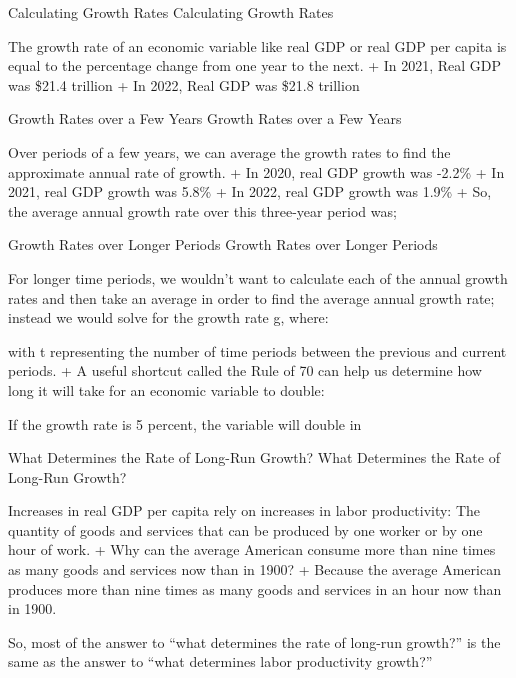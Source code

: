 \documentclass[
  12pt,
  ignorenonframetext,
]{beamer}
\begin{document}
\begin{frame}{Calculating Growth Rates}
\protect\hypertarget{calculating-growth-rates}{}
Calculating Growth Rates

The growth rate of an economic variable like real GDP or real GDP per
capita is equal to the percentage change from one year to the next. + In
2021, Real GDP was \$21.4 trillion + In 2022, Real GDP was \$21.8
trillion
\end{frame}

\begin{frame}{Growth Rates over a Few Years}
\protect\hypertarget{growth-rates-over-a-few-years}{}
Growth Rates over a Few Years

Over periods of a few years, we can average the growth rates to find the
approximate annual rate of growth. + In 2020, real GDP growth was -2.2\%
+ In 2021, real GDP growth was 5.8\% + In 2022, real GDP growth was
1.9\% + So, the average annual growth rate over this three-year period
was;
\end{frame}

\begin{frame}{Growth Rates over Longer Periods}
\protect\hypertarget{growth-rates-over-longer-periods}{}
Growth Rates over Longer Periods

For longer time periods, we wouldn't want to calculate each of the
annual growth rates and then take an average in order to find the
average annual growth rate; instead we would solve for the growth rate
g, where:

with t representing the number of time periods between the previous and
current periods. + A useful shortcut called the Rule of 70 can help us
determine how long it will take for an economic variable to double:

If the growth rate is 5 percent, the variable will double in
\end{frame}

\begin{frame}{What Determines the Rate of Long-Run Growth?}
\protect\hypertarget{what-determines-the-rate-of-long-run-growth}{}
What Determines the Rate of Long-Run Growth?

Increases in real GDP per capita rely on increases in labor
productivity: The quantity of goods and services that can be produced by
one worker or by one hour of work. + Why can the average American
consume more than nine times as many goods and services now than in
1900? + Because the average American produces more than nine times as
many goods and services in an hour now than in 1900.

So, most of the answer to ``what determines the rate of long-run
growth?'' is the same as the answer to ``what determines labor
productivity growth?''
\end{frame}
\end{document}
